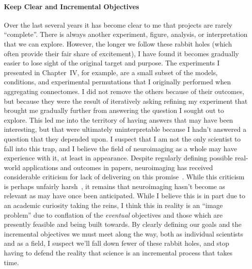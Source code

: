 \paragraph*{Keep Clear and Incremental Objectives}
Over the last several years it has become clear to me that projects are rarely ``complete''. There is always
another experiment, figure, analysis, or interpretation that we can explore. However, the longer we follow these
rabbit holes (which often provide their fair share of excitement), I have found it becomes gradually easier to lose
sight of the original target and purpose. The experiments I presented in Chapter~IV, for example, are a small
subset of the models, conditions, and experimental permutations that I originally performed when aggregating
connectomes. I did not remove the others because of their outcomes, but because they were the result of iteratively
asking refining my experiment that brought me gradually further from answering the question I sought out to explore.
This led me into the territory of having answers that may have been interesting, but that were ultimately
uninterpretable because I hadn't answered a question that they depended upon. I suspect that I am not the only
scientist to fall into this trap, and I believe the field of neuroimaging as a whole may have experience with it, at
least in appearance. Despite regularly defining possible real-world applications and outcomes in papers, neuroimaging
has received considerable criticism for lack of delivering on this promise~\cite{robinson2004fmri}. While this
criticism is perhaps unfairly harsh~\cite{lyon2017dead}, it remains that neuroimaging hasn't become as relevant as
may have once been anticipated. While I believe this is in part due to an academic curiosity taking the reins, I
think this in reality is an ``image problem'' due to conflation of the \textit{eventual} objectives and those which
are presently feasible and being built towards. By clearly defining our goals and the incremental objectives we must
meet along the way, both as individual scientists and as a field, I suspect we'll fall down fewer of these rabbit
holes, and stop having to defend the reality that science is an incremental process that takes time.

